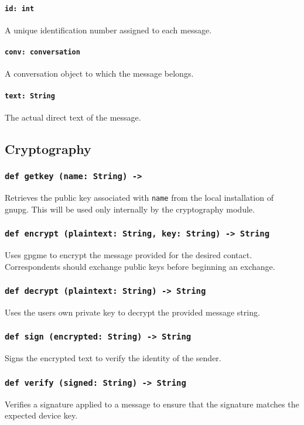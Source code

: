 \documentclass[]{article}
\begin{document}
\paragraph{\texttt{id: int}}
A unique identification number assigned to each message.
\paragraph{\texttt{conv: conversation}}
A conversation object to which the message belongs.
\paragraph{\texttt{text: String}}
The actual direct text of the message.

\subsection{Cryptography}
\subsubsection{\texttt{def getkey (name: String) -> }}
Retrieves the public key associated with \verb|name| from the local installation of gnupg. This will be used only internally by the cryptography module.
\subsubsection{\texttt{def encrypt (plaintext: String, key: String) -> String}}
Uses gpgme to encrypt the message provided for the desired contact. Correspondents should exchange public keys before beginning an exchange.
\subsubsection{\texttt{def decrypt (plaintext: String) -> String}}
Uses the users own private key to decrypt the provided message string.
\subsubsection{\texttt{def sign (encrypted: String) -> String}}
Signs the encrypted text to verify the identity of the sender.
\subsubsection{\texttt{def verify (signed: String) -> String}}
Verifies a signature applied to a message to ensure that the signature matches the expected device key.
\end{document}
